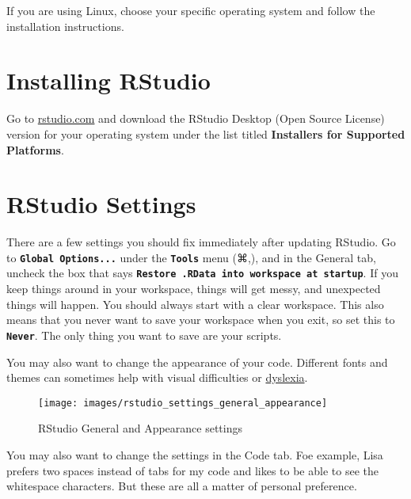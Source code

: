 \documentclass[
  oneside]{book}
\begin{document}
If you are using Linux, choose your specific operating system and follow the installation instructions.

\hypertarget{installing-rstudio}{%
\section{Installing RStudio}\label{installing-rstudio}}

Go to \href{https://www.rstudio.com/products/rstudio/download/\#download}{rstudio.com} and download the RStudio Desktop (Open Source License) version for your operating system under the list titled \textbf{Installers for Supported Platforms}.

\hypertarget{rstudio-settings}{%
\section{RStudio Settings}\label{rstudio-settings}}

There are a few settings you should fix immediately after updating RStudio. Go to \textbf{\texttt{Global\ Options...}} under the \textbf{\texttt{Tools}} menu (⌘,), and in the General tab, uncheck the box that says \textbf{\texttt{Restore\ .RData\ into\ workspace\ at\ startup}}. If you keep things around in your workspace, things will get messy, and unexpected things will happen. You should always start with a clear workspace. This also means that you never want to save your workspace when you exit, so set this to \textbf{\texttt{Never}}. The only thing you want to save are your scripts.

You may also want to change the appearance of your code. Different fonts and themes can sometimes help with visual difficulties or \href{https://datacarpentry.org/blog/2017/09/coding-and-dyslexia}{dyslexia}.

\begin{figure}

{\centering \texttt{[image: images/rstudio\_settings\_general\_appearance]} 

}

\caption{RStudio General and Appearance settings}\label{fig:settings-general}
\end{figure}

You may also want to change the settings in the Code tab. Foe example, Lisa prefers two spaces instead of tabs for my code and likes to be able to see the whitespace characters. But these are all a matter of personal preference.
\end{document}
